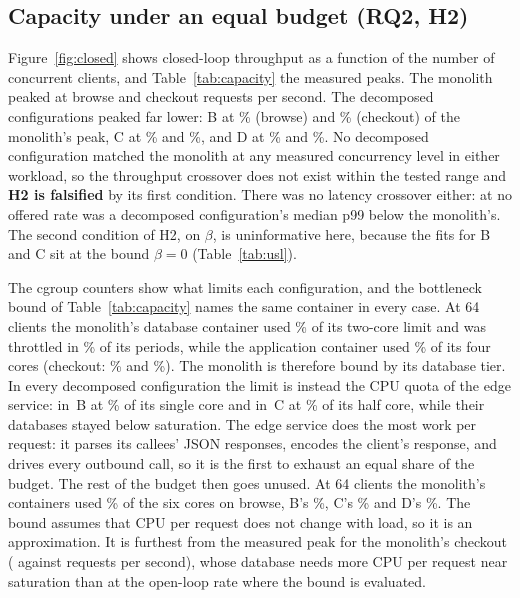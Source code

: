 \subsection{Capacity under an equal budget (RQ2, H2)}
\label{sec:res-capacity}

Figure~\ref{fig:closed} shows closed-loop throughput as a function of the number of concurrent clients, and
Table~\ref{tab:capacity} the measured peaks. The monolith peaked at  browse and
 checkout requests per second. The decomposed configurations peaked far lower: B at
\% (browse) and \% (checkout) of the monolith's peak, C at
\% and \%, and D at \% and
\%. No decomposed configuration matched the monolith at any measured concurrency level in
either workload, so the throughput crossover does not exist within the tested range and \textbf{H2 is falsified} by
its first condition. There was no latency crossover either: at no offered rate was a decomposed configuration's
median p99 below the monolith's. The second condition of H2, on $\beta$, is uninformative here, because the fits
for B and C sit at the bound $\beta = 0$ (Table~\ref{tab:usl}).

The cgroup counters show what limits each configuration, and the bottleneck bound of Table~\ref{tab:capacity}
names the same container in every case. At 64 clients the monolith's database container used
\% of its two-core limit and was throttled in \% of its periods,
while the application container used \% of its four cores (checkout:
\% and \%). The monolith is therefore bound by its
database tier. In every decomposed configuration the limit is instead the CPU quota of the edge service:
\texttt{} in~B at \% of its single core and
\texttt{} in~C at \% of its half core, while their
databases stayed below saturation. The edge service does the most work per request: it parses its callees' JSON
responses, encodes the client's response, and drives every outbound call, so it is the first to exhaust an equal
share of the budget. The rest of the budget then goes unused. At 64 clients the monolith's containers used
\% of the six cores on browse, B's \%, C's \%
and D's \%. The bound assumes that CPU per request does not change with load, so it is an
approximation. It is furthest from the measured peak for the monolith's checkout ( against
 requests per second), whose database needs more CPU per request near saturation than at the
open-loop rate where the bound is evaluated.

